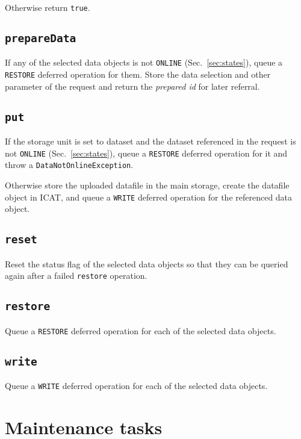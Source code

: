 \documentclass[paper=a4]{scrartcl}
\begin{document}
Otherwise return \texttt{true}.

\subsection{\texttt{prepareData}}
\label{sec:requests:prepareData}

If any of the selected data objects is not \texttt{ONLINE}
(Sec.\ \ref{sec:states}), queue a \texttt{RESTORE} deferred operation
for them. Store the data selection and other parameter of the request
and return the \emph{prepared id} for later referral.

\subsection{\texttt{put}}
\label{sec:requests:put}

If the storage unit is set to dataset and the dataset referenced in
the request is not \texttt{ONLINE} (Sec.\ \ref{sec:states}), queue a
\texttt{RESTORE} deferred operation for it and throw a
\texttt{DataNotOnlineException}.

Otherwise store the uploaded datafile in the main storage, create the
datafile object in ICAT, and queue a \texttt{WRITE} deferred operation
for the referenced data object.

\subsection{\texttt{reset}}

Reset the status flag of the selected data objects so that they can
be queried again after a failed \texttt{restore} operation.

\subsection{\texttt{restore}}

Queue a \texttt{RESTORE} deferred operation for each of the selected
data objects.

\subsection{\texttt{write}}

Queue a \texttt{WRITE} deferred operation for each of the selected
data objects.


\section{Maintenance tasks}
\label{sec:maintenance}
\end{document}
